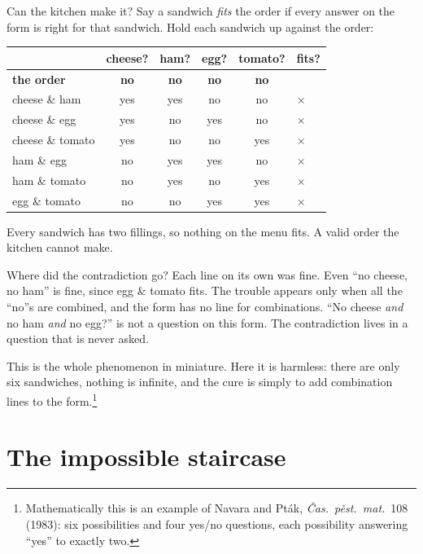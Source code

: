 \documentclass[11pt]{article}
\theoremstyle{plain}
\theoremstyle{definition}
\begin{document}
Can the kitchen make it? Say a sandwich \emph{fits} the order if every answer on
the form is right for that sandwich. Hold each sandwich up against the order:
\begin{center}\small
\begin{tabular}{l | c c c c | l}
 & cheese? & ham? & egg? & tomato? & fits?\\\hline
\textbf{the order} & \textbf{no} & \textbf{no} & \textbf{no} & \textbf{no} & \\\hline
cheese \& ham & yes & yes & no & no & $\times$\\
cheese \& egg & yes & no & yes & no & $\times$\\
cheese \& tomato & yes & no & no & yes & $\times$\\
ham \& egg & no & yes & yes & no & $\times$\\
ham \& tomato & no & yes & no & yes & $\times$\\
egg \& tomato & no & no & yes & yes & $\times$\\
\end{tabular}
\end{center}
Every sandwich has two fillings, so nothing on the menu fits. A valid order the
kitchen cannot make.

Where did the contradiction go? Each line on its own was fine. Even ``no cheese,
no ham'' is fine, since egg \& tomato fits. The trouble appears only when all the
``no''s are combined, and the form has no line for combinations. ``No cheese
\emph{and} no ham \emph{and} no egg?'' is not a question on this form. The
contradiction lives in a question that is never asked.

This is the whole phenomenon in miniature. Here it is harmless: there are only
six sandwiches, nothing is infinite, and the cure is simply to add combination
lines to the form.\footnote{Mathematically this is an example of Navara and
Pt\'ak, \emph{\v{C}as.\ p\v{e}st.\ mat.}\ 108 (1983): six possibilities and four
yes/no questions, each possibility answering ``yes'' to exactly two.}

\section{The impossible staircase}\label{sec:windows}
\end{document}
